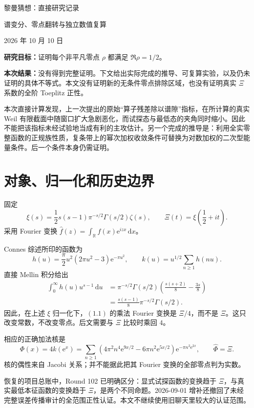\documentclass[UTF8,fontset=none,11pt,a4paper]{ctexart}
\newcommand{\R}{\mathbb R}\newcommand{\C}{\mathbb C}\newcommand{\N}{\mathbb N}
\newcommand{\XiR}{\Xi}\newcommand{\Dom}{\mathfrak D}\newcommand{\PW}{\mathrm{PW}}
\newcommand{\dd}{\,\mathrm d}\newcommand{\e}{\mathrm e}\newcommand{\norm}[1]{\left\lVert#1\right\rVert}
\begin{document}
\begin{center}
{\sffamily\LARGE 黎曼猜想：直接研究记录}\par\vspace{5pt}
{\large 谱变分、零点翻转与独立数值复算}\par\vspace{5pt}
2026 年 10 月 10 日
\end{center}

\noindent\textbf{研究目标：}证明每个非平凡零点 $\rho$ 都满足 $\Re\rho=1/2$。\par
\noindent\textbf{本次结果：}没有得到完整证明。下文给出实际完成的推导、可复算实验，以及仍未证明的具体不等式。本文没有证明新的无条件零点排除区域，也没有证明真实 $\Xi$ 系数的全阶 Toeplitz 正性。

本次直接计算发现，上一次提出的原始“算子残差除以谱隙”指标，在所计算的真实 Weil 有限截面中随窗口扩大急剧恶化，而试探态与最低态的夹角同时缩小。因此不能把该指标未经试验地当成有利的主攻估计。另一个完成的推导是：利用全实零整函数的正规族性质，复条带上的幂次加权收敛条件可替换为对数加权的二次型能量条件。后一个条件本身仍需证明。

\section{对象、归一化和历史边界}
固定
\[
 \xi(s)=\frac12s(s-1)\pi^{-s/2}\Gamma(s/2)\zeta(s),\qquad
 \XiR(t)=\xi\!\left(\frac12+it\right).
\]
采用 Fourier 变换 $\widehat f(z)=\int_{\R}f(x)\e^{izx}\dd x$。

Connes 综述所印的函数为
\[
 h(u)=\frac\pi2u^2(2\pi u^2-3)\e^{-\pi u^2},\qquad
 k(u)=u^{1/2}\sum_{n\ge1}h(nu). \tag{1.1}
\]
直接 Mellin 积分给出
\begin{align*}
 \int_0^\infty h(u)u^{s-1}\dd u
 &=\pi^{-s/2}\Gamma(s/2)
   \left(\frac{s(s+2)}8-\frac{3s}8\right)\\
 &=\frac{s(s-1)}8\pi^{-s/2}\Gamma(s/2).
\end{align*}
因此，在上述 $\xi$ 归一化下，$(1.1)$ 的乘法 Fourier 变换是 $\XiR/4$，而不是 $\XiR$。这只改变常数，不改变零点。后文需要与 $\XiR$ 比较时乘回 $4$。

相应的正确加法核是
\[
 \Phi(x)=4k(\e^x)
 =\sum_{n\ge1}\left(4\pi^2n^4\e^{9x/2}
                  -6\pi n^2\e^{5x/2}\right)
                       \e^{-\pi n^2\e^{2x}},\qquad
 \widehat\Phi=\XiR. \tag{1.2}
\]
核的偶性来自 Jacobi 关系；并不能据此把其 Fourier 变换的全部零点判为实数。

恢复的项目总账中，Round 102 已明确区分：显式试探函数的变换趋于 $\Xi$，与真实最低本征函数的变换趋于 $\Xi$，是两个不同命题。2026-09-01 增补还撤回了未经完整误差传播审计的全范围正性认证。本文不继续使用旧聊天里较大的认证范围。
\end{document}

